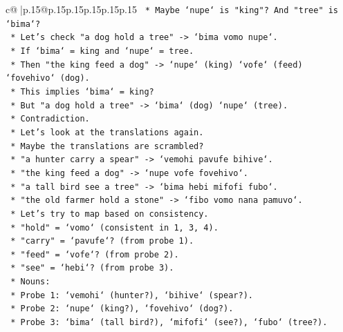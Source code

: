 \documentclass{article}
\begin{document}
{\begin{supertabular}{c@{$\;$}|p{.15\linewidth}@{}p{.15\linewidth}p{.15\linewidth}p{.15\linewidth}p{.15\linewidth}p{.15\linewidth}}
{{{\texttt{                        *   Maybe `nupe` is "king"? And "tree" is `bima`?} \\
\texttt{                        *   Let's check "a dog hold a tree" {-}> `bima vomo nupe`.} \\
\texttt{                        *   If `bima` = king and `nupe` = tree.} \\
\texttt{                        *   Then "the king feed a dog" {-}> `nupe` (king) `vofe` (feed) `fovehivo` (dog).} \\
\texttt{                        *   This implies `bima` = king?} \\
\texttt{                        *   But "a dog hold a tree" {-}> `bima` (dog) `nupe` (tree).} \\
\texttt{                        *   Contradiction.} \\
\texttt{                        *   Let's look at the translations again.} \\
\texttt{                        *   Maybe the translations are scrambled?} \\
\texttt{                        *   "a hunter carry a spear" {-}> `vemohi pavufe bihive`.} \\
\texttt{                        *   "the king feed a dog" {-}> `nupe vofe fovehivo`.} \\
\texttt{                        *   "a tall bird see a tree" {-}> `bima hebi mifofi fubo`.} \\
\texttt{                        *   "the old farmer hold a stone" {-}> `fibo vomo nana pamuvo`.} \\
\texttt{                        *   Let's try to map based on consistency.} \\
\texttt{                        *   "hold" = `vomo` (consistent in 1, 3, 4).} \\
\texttt{                        *   "carry" = `pavufe`? (from probe 1).} \\
\texttt{                        *   "feed" = `vofe`? (from probe 2).} \\
\texttt{                        *   "see" = `hebi`? (from probe 3).} \\
\texttt{                        *   Nouns:} \\
\texttt{                            *   Probe 1: `vemohi` (hunter?), `bihive` (spear?).} \\
\texttt{                            *   Probe 2: `nupe` (king?), `fovehivo` (dog?).} \\
\texttt{                            *   Probe 3: `bima` (tall bird?), `mifofi` (see?), `fubo` (tree?).} \\
}}}
\end{supertabular}}
\end{document}
